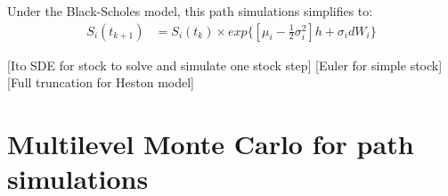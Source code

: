 \documentclass{article}
\begin{document}
	Under the Black-Scholes model, this path simulations simplifies to:
	\begin{align}
	S_i(t_{k+1}) &= S_i(t_k) \times exp\{[\mu_i - \frac{1}{2} \sigma_i^2] h + \sigma_i dW_i \}
	\end{align}
	
	[Ito SDE for stock to solve and simulate one stock step]
	[Euler for simple stock]
	[Full truncation for Heston model]

\section{Multilevel Monte Carlo for path simulations}



\end{document}
